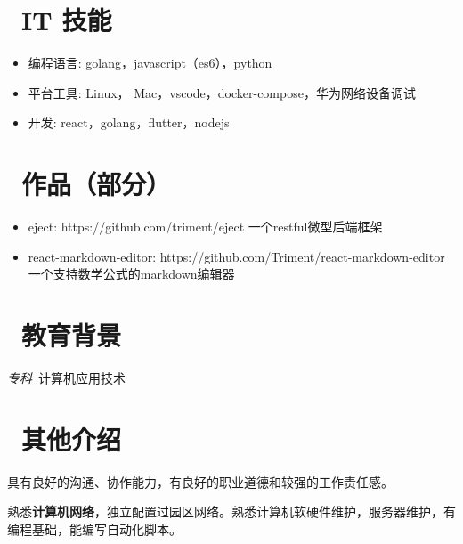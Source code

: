 \documentclass{resume}
\begin{document}

\section{\faCogs\ IT 技能}
\begin{itemize}[parsep=0.5ex]
  \item 编程语言: golang，javascript（es6），python
  \item 平台工具: Linux， Mac，vscode，docker-compose，华为网络设备调试
  \item 开发: react，golang，flutter，nodejs
\end{itemize}

\section{\faGithub\ 作品（部分）}
\begin{itemize}[parsep=0.5ex]
  \item eject: https://github.com/triment/eject 一个restful微型后端框架~
  \item react-markdown-editor: https://github.com/Triment/react-markdown-editor 一个支持数学公式的markdown编辑器~
\end{itemize}

\section{\faGraduationCap\  教育背景}
\textit{专科}\ 计算机应用技术

\section{\faSunO\ 其他介绍}

具有良好的沟通、协作能力，有良好的职业道德和较强的工作责任感。

熟悉\textbf{计算机网络}，独立配置过园区网络。熟悉计算机软硬件维护，服务器维护，有编程基础，能编写自动化脚本。
%
%
\end{document}
